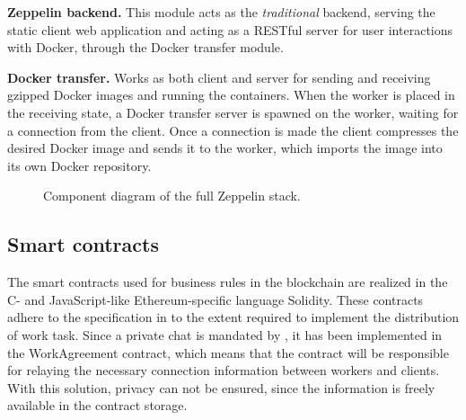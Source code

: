 \textbf{Zeppelin backend.} This module acts as the \textit{traditional} backend, serving the static client web application and acting as a RESTful server for user interactions with Docker, through the Docker transfer module.

\textbf{Docker transfer.} Works as both client and server for sending and receiving gzipped Docker images and running the containers. When the worker is placed in the receiving state, a Docker transfer server is spawned on the worker, waiting for a connection from the client. Once a connection is made the client compresses the desired Docker image and sends it to the worker, which imports the image into its own Docker repository.

\begin{figure}[ht]
\centering
{}
\caption{Component diagram of the full Zeppelin stack.}
\label{zep-stack}
\end{figure}

\subsection{Smart contracts}
The smart contracts used for business rules in the blockchain are realized in the C- and JavaScript-like Ethereum-specific language Solidity. These contracts adhere to the specification in  to the extent required to implement the distribution of work task. Since a private chat is mandated by , it has been implemented in the WorkAgreement contract, which means that the contract will be responsible for relaying the necessary connection information between workers and clients. With this solution, privacy can not be ensured, since the information is freely available in the contract storage.

